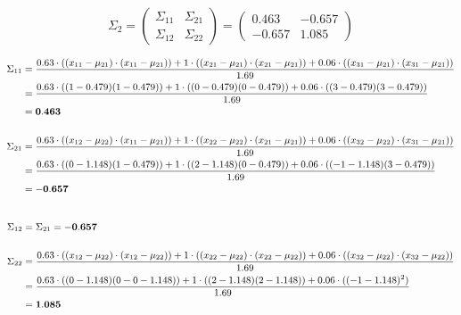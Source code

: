 \documentclass[12pt]{article}
\begin{document}
\begin{enumerate}
    \begin{equation*}
        \Sigma_2 = \begin{pmatrix}
            \Sigma_{11} & \Sigma_{21} \\
            \Sigma_{12} & \Sigma_{22}
        \end{pmatrix} = \begin{pmatrix}
            0.463 & -0.657\\
            -0.657 & 1.085
        \end{pmatrix}
    \end{equation*}

    \begin{equation*}
        \fontsize{9pt}{10pt}\selectfont
        \begin{aligned}
            \Sigma_{11} &= \frac{0.63 \cdot ((x_{11}-\mu_{21}) \cdot (x_{11} - \mu_{21}))+ 1 \cdot ((x_{21}-\mu_{21}) \cdot (x_{21} - \mu_{21}))+ 0.06 \cdot ((x_{31}-\mu_{21}) \cdot (x_{31} - \mu_{21}))}{1.69}\\
            &=\frac{0.63 \cdot ((1-0.479)(1-0.479)) + 1 \cdot ((0-0.479)(0-0.479))+ 0.06 \cdot ((3-0.479)(3-0.479))}{1.69} \\
            &= \mathbf{0.463}\\
            \\
            \Sigma_{21} &= \frac{0.63 \cdot ((x_{12}-\mu_{22}) \cdot (x_{11} - \mu_{21}))+ 1 \cdot ((x_{22}-\mu_{22}) \cdot (x_{21} - \mu_{21}))+ 0.06 \cdot ((x_{32}-\mu_{22}) \cdot (x_{31} - \mu_{21}))}{1.69}\\
            &=\frac{0.63 \cdot ((0-1.148)(1-0.479)) + 1 \cdot ((2-1.148)(0-0.479)) + 0.06 \cdot ((-1-1.148)(3-0.479))}{1.69} \\
            &= \mathbf{-0.657}\\
            \\
        \end{aligned}
    \end{equation*}

    \begin{equation*}
        \fontsize{9pt}{10pt}\selectfont
        \begin{aligned}
            \Sigma_{12} &= \Sigma_{21} = \mathbf{-0.657}\\
            \\
            \Sigma_{22} &= \frac{0.63 \cdot ((x_{12}-\mu_{22}) \cdot (x_{12} - \mu_{22}))+ 1 \cdot ((x_{22}-\mu_{22}) \cdot (x_{22} - \mu_{22}))+ 0.06 \cdot ((x_{32}-\mu_{22}) \cdot (x_{32} - \mu_{22}))}{1.69}\\
            &=\frac{0.63 \cdot ((0-1.148)(0-0-1.148)) + 1 \cdot ((2-1.148)(2-1.148)) + 0.06 \cdot ((-1-1.148)^2)}{1.69}\\
            &= \mathbf{1.085}\\
        \end{aligned}
    \end{equation*}


\end{enumerate}
\end{document}
